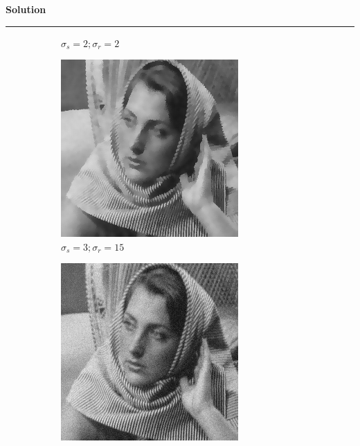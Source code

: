 \documentclass[a4paper]{article}
\newenvironment{solution}[2][]{%
    \begin{mdframed}[linecolor=green!60!black, linewidth=2pt, roundcorner=10pt, backgroundcolor=green!5!white, skipabove=12pt, skipbelow=12pt]%
        \textbf{\large #2} %
        \par\noindent\rule{\textwidth}{0.4pt} %
        \vspace{0.5em} %
}{%
    \end{mdframed}%
}
\begin{document}
\begin{solution}{Solution}
\begin{figure}[H]
\begin{subfigure}[b]{0.24\textwidth}
        \caption{$\sigma_s=2;\sigma_r=2$}
        \label{fig:subfig2}
    \end{subfigure}
    \begin{subfigure}[b]{0.24\textwidth}
        \centering
        \includegraphics[width=\textwidth]{../images/filtered_barbara256_meanshift_sigma_10_sigma_s_3_sigma_r_15.png}
        \caption{$\sigma_s=3;\sigma_r=15$}
        \label{fig:subfig3}
    \end{subfigure}
    \begin{subfigure}[b]{0.24\textwidth}
        \centering
        \includegraphics[width=\textwidth]{../images/filtered_barbara256_meanshift_sigma_10_sigma_s_15_sigma_r_3.png}

\end{subfigure}
\end{figure}
\end{solution}
\end{document}
